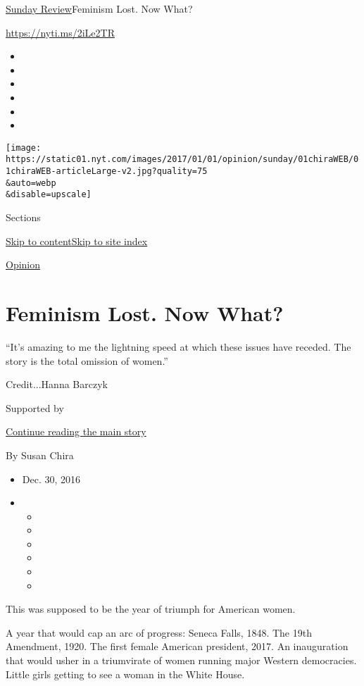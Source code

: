 \href{/section/opinion/sunday}{Sunday Review}\textbar{}Feminism Lost.
Now What?

\url{https://nyti.ms/2iLe2TR}

\begin{itemize}
\item
\item
\item
\item
\item
\item
\end{itemize}

\texttt{[image: https://static01.nyt.com/images/2017/01/01/opinion/sunday/01chiraWEB/01chiraWEB-articleLarge-v2.jpg?quality=75\\\&auto=webp\\\&disable=upscale]}

Sections

\protect\hyperlink{site-content}{Skip to
content}\protect\hyperlink{site-index}{Skip to site index}

\href{/section/opinion}{Opinion}

\hypertarget{feminism-lost-now-what}{%
\section{Feminism Lost. Now What?}\label{feminism-lost-now-what}}

``It's amazing to me the lightning speed at which these issues have
receded. The story is the total omission of women.''

Credit...Hanna Barczyk

Supported by

\protect\hyperlink{after-sponsor}{Continue reading the main story}

By Susan Chira

\begin{itemize}
\item
  Dec. 30, 2016
\item
  \begin{itemize}
  \item
  \item
  \item
  \item
  \item
  \item
  \end{itemize}
\end{itemize}

This was supposed to be the year of triumph for American women.

A year that would cap an arc of progress: Seneca Falls, 1848. The 19th
Amendment, 1920. The first female American president, 2017. An
inauguration that would usher in a triumvirate of women running major
Western democracies. Little girls getting to see a woman in the White
House.

